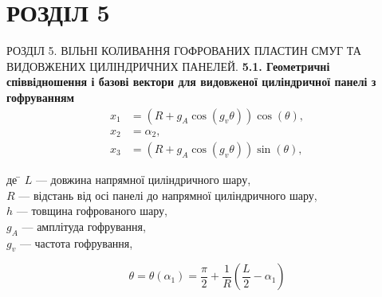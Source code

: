 \documentclass[8pt]{beamer}
\numberwithin{figure}{section}
\numberwithin{equation}{section}
\numberwithin{table}{section}
\begin{document}
\section{РОЗДІЛ 5}

\begin{frame}{РОЗДІЛ 5. ВІЛЬНІ КОЛИВАННЯ ГОФРОВАНИХ ПЛАСТИН СМУГ ТА ВИДОВЖЕНИХ ЦИЛІНДРИЧНИХ ПАНЕЛЕЙ.}
\textbf{5.1. Геометричні співвідношення і базові вектори для видовженої циліндричної панелі з гофруванням}
\\
\vspace{1em}
\begin{align}
x_1&=\left(R + g_{A}\cos\left(g_v\theta\right) \right)\cos\left(\theta\right), \\
x_2&=\alpha_2,\\
x_3&=\left(R + g_{A}\cos\left(g_v\theta\right) \right)\sin\left(\theta\right), 
\end{align}

\begin{tabbing}
де \= $L$ --- довжина напрямної циліндричного шару,\\
\> $R$ --- відстань від осі панелі до напрямної циліндричного шару,\\
\> $h$ --- товщина гофрованого шару,\\
\> $g_A$ --- амплітуда гофрування,\\
\> $g_v$ --- частота гофрування,\\
\end{tabbing}
\[
\theta=\theta\left(\alpha_1\right)=\frac{\pi}{2}+\frac{1}{R}\left(\frac{L}{2}-\alpha_1\right)\]


\end{frame}
\end{document}
